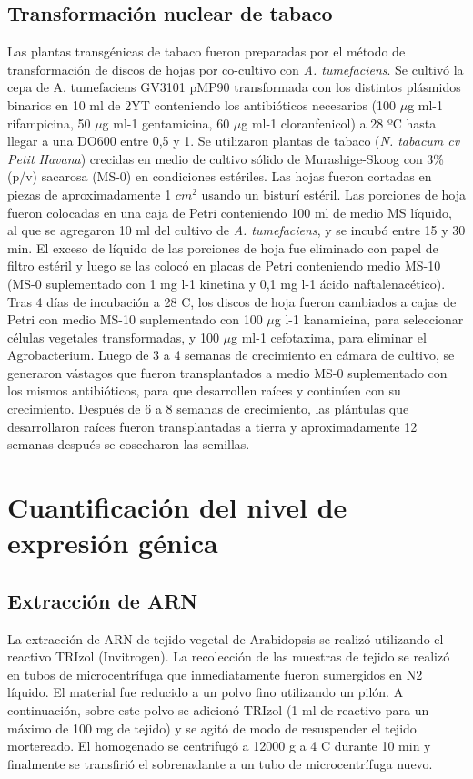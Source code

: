 \subsection{Transformación nuclear de tabaco}
Las plantas transgénicas de tabaco fueron preparadas por el método de transformación de discos de hojas por co-cultivo con \textit{A. tumefaciens}.
Se cultivó la cepa de A. tumefaciens GV3101 pMP90 transformada con los distintos plásmidos binarios en 10 ml de 2YT conteniendo los antibióticos necesarios (100 $\mu$g ml-1 rifampicina, 50 $\mu$g ml-1 gentamicina, 60 $\mu$g ml-1 cloranfenicol) a 28 ºC hasta llegar a una DO600 entre 0,5 y 1.
Se utilizaron plantas de tabaco (\textit{N. tabacum cv Petit Havana}) crecidas en medio de cultivo sólido de Murashige-Skoog con 3\% (p/v) sacarosa (MS-0) en condiciones estériles.
Las hojas fueron cortadas en piezas de aproximadamente 1 $cm^2$ usando un bisturí estéril.
Las porciones de hoja fueron colocadas en una caja de Petri conteniendo 100 ml de medio MS líquido, al que se agregaron 10 ml del cultivo de \textit{A. tumefaciens}, y se incubó entre 15 y 30 min.
El exceso de líquido de las porciones de hoja fue eliminado con papel de filtro estéril y luego se las colocó en placas de Petri conteniendo medio MS-10 (MS-0 suplementado con 1 mg l-1 kinetina y 0,1 mg l-1 ácido naftalenacético).
Tras 4 días de incubación a 28 \degree C, los discos de hoja fueron cambiados a cajas de Petri con medio MS-10 suplementado con 100 $\mu$g l-1 kanamicina, para seleccionar células vegetales transformadas, y 100 $\mu$g ml-1 cefotaxima, para eliminar el Agrobacterium.
Luego de 3 a 4 semanas de crecimiento en cámara de cultivo, se generaron vástagos que fueron transplantados a medio MS-0 suplementado con los mismos antibióticos, para que desarrollen raíces y continúen con su crecimiento.
Después de 6 a 8 semanas de crecimiento, las plántulas que desarrollaron raíces fueron transplantadas a tierra y aproximadamente 12 semanas después se cosecharon las semillas.

\section{Cuantificación del nivel de expresión génica}

\subsection{Extracción de ARN}
\label{sec:extraccion_ARN}
La extracción de ARN de tejido vegetal de Arabidopsis se realizó utilizando el reactivo TRIzol (Invitrogen).
La recolección de las muestras de tejido se realizó en tubos de microcentrífuga que inmediatamente fueron sumergidos en N2 líquido.
El material fue reducido a un polvo fino utilizando un pilón. A continuación, sobre este polvo se adicionó TRIzol (1 ml de reactivo para un máximo de 100 mg de tejido) y se agitó de modo de resuspender el tejido mortereado.
El homogenado se centrifugó a 12000 g a 4 \degree C durante 10 min y finalmente se transfirió el sobrenadante a un tubo de microcentrífuga nuevo.

